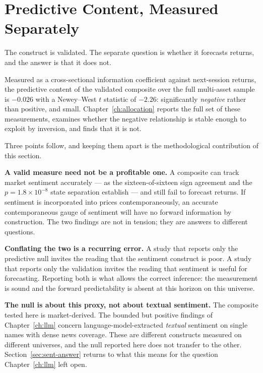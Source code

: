 \section{Predictive Content, Measured Separately}
\label{sec:sent-predict}

The construct is validated. The separate question is whether it forecasts returns, and the answer
is that it does not.

Measured as a cross-sectional information coefficient against next-session returns, the predictive
content of the validated composite over the full multi-asset sample is $-0.026$ with a Newey--West
$t$ statistic of $-2.26$: significantly \emph{negative} rather than positive, and small.
Chapter~\ref{ch:allocation} reports the full set of these measurements, examines whether the
negative relationship is stable enough to exploit by inversion, and finds that it is not.

Three points follow, and keeping them apart is the methodological contribution of this section.

\textbf{A valid measure need not be a profitable one.} A composite can track market sentiment
accurately --- as the sixteen-of-sixteen sign agreement and the $p = 1.8\times10^{-8}$ state
separation establish --- and still fail to forecast returns. If sentiment is incorporated into
prices contemporaneously, an accurate contemporaneous gauge of sentiment will have no forward
information by construction. The two findings are not in tension; they are answers to different
questions.

\textbf{Conflating the two is a recurring error.} A study that reports only the predictive null
invites the reading that the sentiment construct is poor. A study that reports only the validation
invites the reading that sentiment is useful for forecasting. Reporting both is what allows the
correct inference: the measurement is sound and the forward predictability is absent at this
horizon on this universe.

\textbf{The null is about this proxy, not about textual sentiment.} The composite tested here is
market-derived. The bounded but positive findings of Chapter~\ref{ch:llm} concern
language-model-extracted \emph{textual} sentiment on single names with dense news coverage. These
are different constructs measured on different universes, and the null reported here does not
transfer to the other. Section~\ref{sec:sent-answer} returns to what this means for the question
Chapter~\ref{ch:llm} left open.

